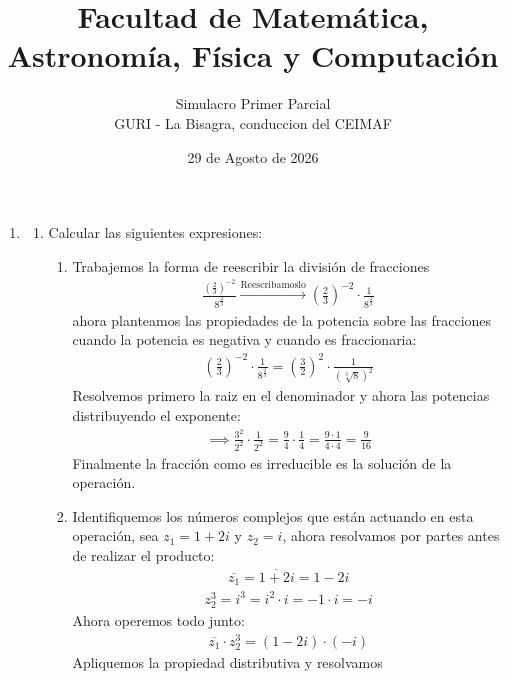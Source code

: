 \documentclass[11pt]{article}
\title{\small Facultad de Matemática, Astronomía, Física y Computación}
\author{Simulacro Primer Parcial\\ GURI - La Bisagra, conduccion del CEIMAF}
\date{29 de Agosto de 2026}
\begin{document}
\maketitle
\begin{enumerate}
    \item 
    \begin{enumerate}
        \item Calcular las siguientes expresiones:
        \begin{enumerate}
        \item Trabajemos la forma de reescribir la división de fracciones
        \begin{gather*}
            \frac{\left(\frac{2}{3}\right)^{-2}}{8^{\frac{2}{3}}} \xrightarrow{\text{Reescribamoslo}} \left(\frac{2}{3}\right)^{-2} \cdot \frac{1}{8^{\frac{2}{3}}}
        \end{gather*}
        ahora planteamos las propiedades de la potencia sobre las fracciones cuando la potencia es negativa y cuando es fraccionaria:
        \begin{gather*}
            \left(\frac{2}{3}\right)^{-2}\cdot \frac{1}{8^{\frac{2}{3}}}= \left(\frac{3}{2}\right)^2 \cdot \frac{1}{\left(\sqrt[3]{8}\right)^2} 
        \end{gather*}
        Resolvemos primero la raiz en el denominador y ahora las potencias distribuyendo el exponente:
        \begin{gather*}
            \implies \frac{3^2}{2^2}\cdot \frac{1}{2^2} = \frac{9}{4} \cdot \frac{1}{4} = \frac{9 \cdot 1}{4 \cdot 4} = \frac{9}{16}
        \end{gather*}
        Finalmente la fracción como es irreducible es la solución de la operación.
        \item Identifiquemos los números complejos que están actuando en esta operación, sea $z_1=1+2i$ y $z_2=i$, ahora resolvamos por partes antes de realizar el producto:
        \begin{gather*}
            \overline{z_1}=\overline{1+2i}=1-2i
        \end{gather*}
        \begin{gather*}
            z_2^3=i^3=i^2 \cdot i = -1 \cdot i = -i
        \end{gather*}
        Ahora operemos todo junto:
        \begin{gather*}
            \overline{z_1} \cdot z_2^3 = (1-2i) \cdot (-i)
        \end{gather*}
        Apliquemos la propiedad distributiva y resolvamos
        \begin{gather*}

\end{gather*}
\end{enumerate}
\end{enumerate}
\end{enumerate}
\end{document}

